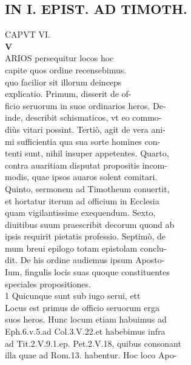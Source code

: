 \documentclass{article}
\begin{document}
\begin{pages}
\section*{IN I. EPIST. AD TIMOTH. \\
                }
CAPVT VI. \\
                
\textbf{V \\
                }ARIOS persequitur locos hoc \\
                capite quos ordine recensebimus. \\
                quo facilior sit illorum deinceps \\
                explicatio. Primum, disserit de of- \\
                ficio seruorum in suos ordinarios heros. De- \\
                inde, describit schismaticos, vt eo commo- \\
                diùs vitari possint. Tertiò, agit de vera ani- \\
                mi sufficientia qua sua sorte homines con- \\
                tenti sunt, nihil insuper appetentes. Quarto, \\
                contra auaritiam disputat propositis incom- \\
                modis, quae ipsos auaros solent comitari. \\
                Quinto, sermonem ad Timotheum conuertit, \\
                et hortatur iterum ad officium in Ecclesia \\
                quam vigilantissime exequendum. Sexto, \\
                diuitibus suum praescribit decorum quond ab \\
                ipsis requirit pietatis professio. Septimò, de \\
                mum breui epilogo totam epistolam conclu- \\
                dit. De his ordine audiemus ipsum Aposto- \\
                Ium, fingulis locis suas quoque constituentes \\
                speciales propositiones. \\
                1 Quicunque sunt sub iugo serui, ett \\
                Locus est primus de officio seruorum erga \\
                suos heros. Hunc locum etiam habuimus ad \\
                Eph.6.v.5.ad Col.3.V.22.et habebimus infra \\
                ad Tit.2.V.9.1.ep. Pet.2.V.18, quibus consonant \\
                illa quae ad Rom.13. habentur. Hoc loco Apo- \\
                

\end{pages}
\end{document}
